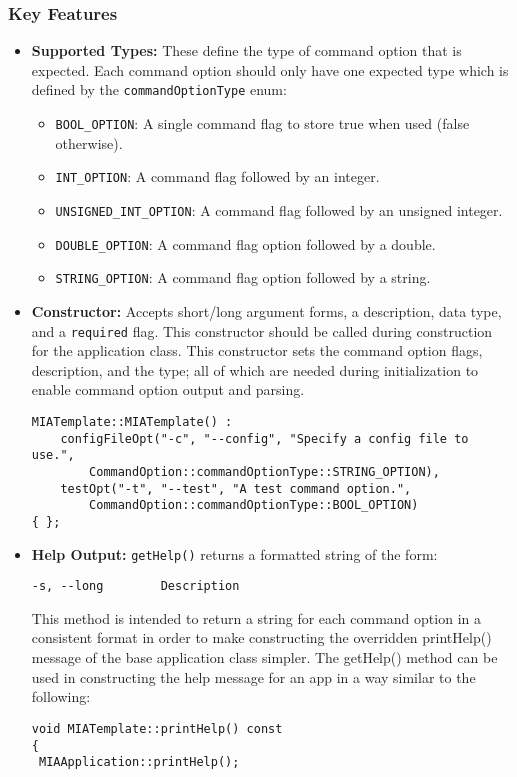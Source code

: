 \subsubsection*{Key Features}
\begin{itemize}\itemsep0em
	\item \textbf{Supported Types:} These define the type of command option that is expected. Each command option should only have one expected type which is defined by the \texttt{commandOptionType} enum:
	\begin{itemize}\itemsep0em
		\item \texttt{BOOL\_OPTION}: A single command flag to store true when used (false otherwise).
		\item \texttt{INT\_OPTION}: A command flag followed by an integer.
		\item \texttt{UNSIGNED\_INT\_OPTION}: A command flag followed by an unsigned integer.
		\item \texttt{DOUBLE\_OPTION}: A command flag option followed by a double.
		\item \texttt{STRING\_OPTION}: A command flag option followed by a string.
	\end{itemize}
	
	\item \textbf{Constructor:} Accepts short/long argument forms, a description, data type, and a \texttt{required} flag. This constructor should be called during construction for the application class. This constructor sets the command option flags, description, and the type; all of which are needed during initialization to enable command option output and parsing.
	\begin{lstlisting}[style=cppstyle]
MIATemplate::MIATemplate() : 
    configFileOpt("-c", "--config", "Specify a config file to use.",
        CommandOption::commandOptionType::STRING_OPTION),
    testOpt("-t", "--test", "A test command option.",
        CommandOption::commandOptionType::BOOL_OPTION)            
{ };
	\end{lstlisting}
	
	\item \textbf{Help Output:} \texttt{getHelp()} returns a formatted string of the form:
	\begin{lstlisting}
-s, --long        Description
	\end{lstlisting}
	This method is intended to return a string for each command option in a consistent format in order to make constructing the overridden printHelp() message of the base application class simpler. The getHelp() method can be used in constructing the help message for an app in a way similar to the following:
	\begin{lstlisting}[style=cppstyle]
void MIATemplate::printHelp() const
{
 MIAApplication::printHelp();
 

\end{lstlisting}
\end{itemize}
